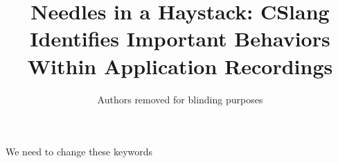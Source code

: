 \documentclass{IEEEtran}
\begin{document}
\title{Needles in a Haystack:
      CSlang Identifies Important Behaviors Within Application Recordings}

\newcommand{\showurlx}{[redacted]}

\author{Authors removed for blinding purposes}

\maketitle


\begin{IEEEkeywords}
  We need to change these keywords
\end{IEEEkeywords}











\end{document}

